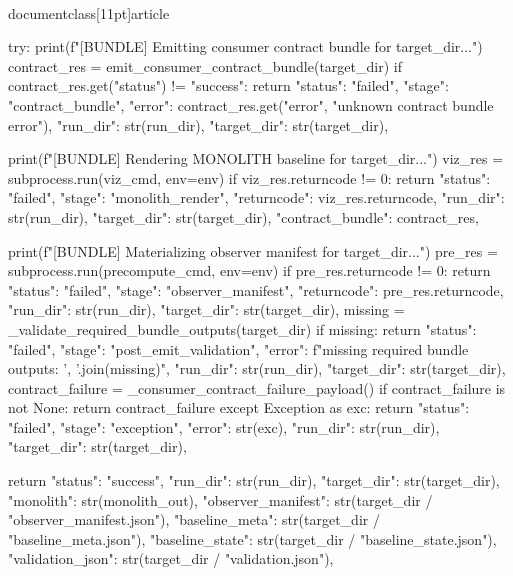 \\documentclass[11pt]{article}
\begin{document}
\begin{CodeBlock}
    try:
        print(f"[BUNDLE] Emitting consumer contract bundle for {target_dir}...")
        contract_res = emit_consumer_contract_bundle(target_dir)
        if contract_res.get("status") != "success":
            return {
                "status": "failed",
                "stage": "contract_bundle",
                "error": contract_res.get("error", "unknown contract bundle error"),
                "run_dir": str(run_dir),
                "target_dir": str(target_dir),
            }

        print(f"[BUNDLE] Rendering MONOLITH baseline for {target_dir}...")
        viz_res = subprocess.run(viz_cmd, env=env)
        if viz_res.returncode != 0:
            return {
                "status": "failed",
                "stage": "monolith_render",
                "returncode": viz_res.returncode,
                "run_dir": str(run_dir),
                "target_dir": str(target_dir),
                "contract_bundle": contract_res,
            }

        print(f"[BUNDLE] Materializing observer manifest for {target_dir}...")
        pre_res = subprocess.run(precompute_cmd, env=env)
        if pre_res.returncode != 0:
            return {
                "status": "failed",
                "stage": "observer_manifest",
                "returncode": pre_res.returncode,
                "run_dir": str(run_dir),
                "target_dir": str(target_dir),
            }
        missing = _validate_required_bundle_outputs(target_dir)
        if missing:
            return {
                "status": "failed",
                "stage": "post_emit_validation",
                "error": f"missing required bundle outputs: {', '.join(missing)}",
                "run_dir": str(run_dir),
                "target_dir": str(target_dir),
            }
        contract_failure = _consumer_contract_failure_payload()
        if contract_failure is not None:
            return contract_failure
    except Exception as exc:
        return {
            "status": "failed",
            "stage": "exception",
            "error": str(exc),
            "run_dir": str(run_dir),
            "target_dir": str(target_dir),
        }

    return {
        "status": "success",
        "run_dir": str(run_dir),
        "target_dir": str(target_dir),
        "monolith": str(monolith_out),
        "observer_manifest": str(target_dir / "observer_manifest.json"),
        "baseline_meta": str(target_dir / "baseline_meta.json"),
        "baseline_state": str(target_dir / "baseline_state.json"),
        "validation_json": str(target_dir / "validation.json"),
    }



\end{CodeBlock}
\end{document}
